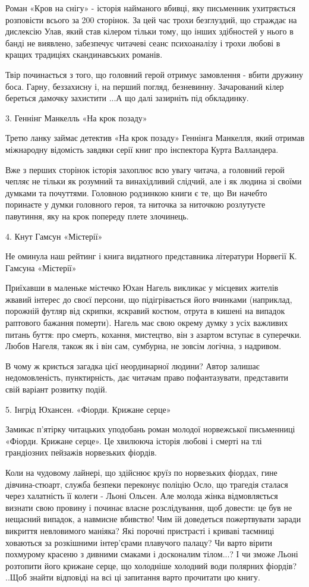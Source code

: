 Роман «Кров на снігу» - історія найманого вбивці, яку письменник ухитряється
розповісти всього за 200 сторінок. За цей час трохи безглуздий, що страждає на
дислексію Улав, який став кілером тільки тому, що інших здібностей у  нього в
банді не виявлено, забезпечує читачеві сеанс психоаналізу і трохи любові в
кращих традиціях скандинавських романів. 

Твір починається з того, що головний герой отримує замовлення - вбити дружину
боса. Гарну, беззахисну і, на перший погляд, безневинну. Зачарований кілер
береться дамочку захистити ...А що далі зазирніть під обкладинку.

3. Геннінг Манкелль «На крок позаду» 

Третю ланку займає детектив «На крок позаду» Геннінга Манкелля, який отримав
міжнародну відомість завдяки серії книг про інспектора Курта Валландера.  

Вже з перших сторінок історія захоплює всю увагу читача, а головний герой
чепляє не тільки як розумний та винахідливий слідчий, але і як людина зі своїми
думками та почуттями. Головною родзинкою книги є те, що Ви начебто поринаєте у
думки головного героя, та ниточка за ниточкою розлутуєте павутиння, яку на крок
попереду плете злочинець.

4. Кнут Гамсун  «Містерії» 

Не оминула наш рейтинг і книга видатного представника літератури Норвегії К. Гамсуна «Містерії»

Приїхавши в маленьке містечко Юхан Нагель викликає у місцевих жителів жвавий
інтерес до своєї персони, що підігрівається його вчинками (наприклад, порожній
футляр від скрипки, яскравий костюм, отрута в кишені на випадок раптового
бажання померти). Нагель має свою окрему думку з усіх важливих питань буття:
про смерть, кохання, мистецтво, він з азартом вступає в суперечки. Любов
Нагеля, також як і він сам, сумбурна, не зовсім логічна, з надривом.

В чому ж криється загадка цієї неординарної людини? Автор залишає
недомовленість, пунктирність, дає читачам право пофантазувати, представити свій
варіант розвитку подій.

5. Інгрід Юхансен. «Фіорди. Крижане серце»

Замикає п'ятірку читацьких уподобань роман молодої норвежської письменниці
«Фіорди. Крижане серце».  Це хвилююча історія любові і смерті на тлі
грандіозних пейзажів норвезьких фіордів.

Коли на чудовому лайнері, що здійснює круїз по норвезьких фіордах, гине
дівчина-стюарт, служба безпеки переконує поліцію Осло, що трагедія сталася
через халатність її колеги - Льоні Ольсен. Але молода жінка відмовляється
визнати свою провину і починає власне розслідування, щоб довести: це був не
нещасний випадок, а навмисне вбивство! Чим їй доведеться пожертвувати заради
викриття невловимого маніяка? Які порочні пристрасті і криваві таємниці
ховаються за розкішними  інтер'єрами плавучого палацу? Чи варто вірити
похмурому красеню з дивними смаками і досконалим тілом...? І чи зможе Льоні
розтопити його крижане серце, що холодніше холодний води полярних фіордів?
..Щоб знайти відповіді на всі ці запитання варто прочитати цю книгу.
